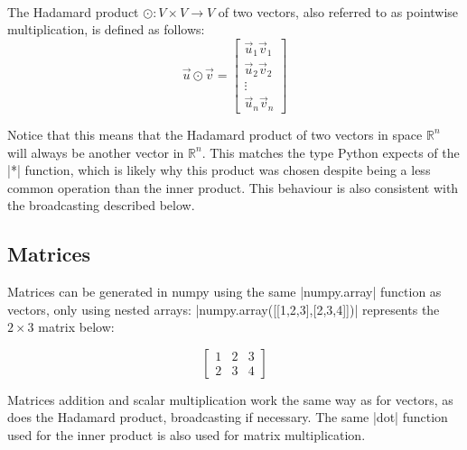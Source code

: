 \begin{aside}\mbox{}\\\label{hadamard}
The Hadamard product $\odot : V \times V \to V$ of two vectors, also referred to as pointwise multiplication, is defined as follows:
$$ \vec u \odot \vec v = \begin{bmatrix} \vec u_1 \vec v_1 \\ \vec u_2 \vec v_2 \\ \vdots \\ \vec u_n \vec v_n \end{bmatrix} $$

Notice that this means that the Hadamard product of two vectors in space $\mathbb{R}^n$ will always be another vector in $\mathbb{R}^n$. This matches the type Python expects of the \py|*| function, which is likely why this product was chosen despite being a less common operation than the inner product. This behaviour is also consistent with the broadcasting described below.
\end{aside}

\subsection{Matrices}
Matrices can be generated in numpy using the same \py|numpy.array| function as vectors, only using nested arrays: \py|numpy.array([[1,2,3],[2,3,4]])| represents the $2\times 3$ matrix below:

$$\begin{bmatrix}1&2&3\\2&3&4\end{bmatrix}$$

  Matrices addition and scalar multiplication work the same way as for vectors, as does the Hadamard product, broadcasting if necessary. The same \py|dot| function used for the inner product is also used for matrix multiplication.

